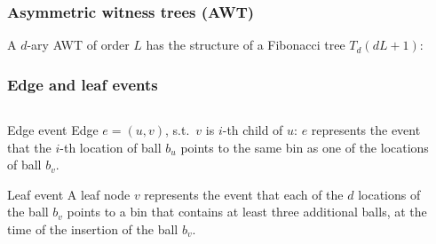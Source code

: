 \documentclass[serif,professionalfonts]{beamer}
\newcommand\todo[1]{\textcolor{red}{(TODO: #1)}}
\begin{document}
\begin{frame}
\frametitle{Asymmetric witness trees (AWT)} 
A $d$-ary AWT of order $L$ has the structure of a Fibonacci tree $T_d(dL+1)$:

\begin{center}
\end{center}
\end{frame}

\newcommand\defEdgeEvent{
\begin{exampleblock}{Edge event}
Edge $e =(u,v)$, s.t.~$v$ is $i$-th child of $u$: $e$ represents the event that the $i$-th location of ball $b_u$ points to the same bin as one of the locations of ball $b_v$.
\end{exampleblock}
}

\newcommand\defLeafEvent{
\begin{exampleblock}{Leaf event}
A leaf node $v$ represents the event that each of the $d$ locations of the ball $b_v$ points to a bin that contains at least three additional balls, at the time of the insertion of the ball $b_v$.
\end{exampleblock}
}

\begin{frame}
\frametitle{Edge and leaf events}
\begin{columns}[onlytextwidth]
\begin{column}{0.7\textwidth}
\defEdgeEvent

\defLeafEvent
\end{column}
\begin{column}{0.3\textwidth}
\end{column}
\end{columns}

\end{frame}
\end{document}
